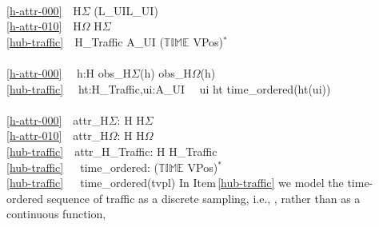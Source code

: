 \bp
{}\\
\ref{h-attr-000}\ \ H$\Sigma$ {\EQ} (L\_UI{\TIMES}L\_UI)\\
\ref{h-attr-010}\ \ H$\Omega$ {\EQ} H$\Sigma$\\
\ref{hub-traffic}\ \ H\_Traffic {\EQ} A\_UI {\MARROW} ($\mathbb{TIME}$ {\TIMES} VPos)$^{\ast}$\\
\\
\ref{h-attr-000}\ \ {\ALL} h:H {\RDOT} obs\_H$\Sigma$(h) {\ISIN} obs\_H$\Omega$(h)\\
\ref{hub-traffic}\ \ {\ALL} ht:H\_Traffic,ui:A\_UI {\RDOT}\ \ ui {\ISIN}  ht {\DBLRIGHTARROW} time\_ordered(ht(ui))\\
 \\
\ref{h-attr-000}\ \ attr\_H$\Sigma$: H {\RIGHTARROW} H$\Sigma$\\
\ref{h-attr-010}\ \ attr\_H$\Omega$: H {\RIGHTARROW} H$\Omega$ \\
\ref{hub-traffic}\ \ attr\_H\_Traffic: H {\RIGHTARROW} H\_Traffic\\
\ref{hub-traffic}\ \ \ time\_ordered: ($\mathbb{TIME}$ {\TIMES} VPos)$^{\ast}$ {\RIGHTARROW} \\
\ref{hub-traffic}\ \ \ time\_ordered(tvpl) {\IS} {\DOTDOTDOT}
\ep
\pos{\normalsize}{\HHHH}\rm
\noindent
\begynd
\pind In Item\,\ref{hub-traffic} we model the time-ordered sequence
      of traffic as a discrete sampling, i.e., {\MARROW}, rather than as a
      continuous function, {\RIGHTARROW} \eod
\afslut

